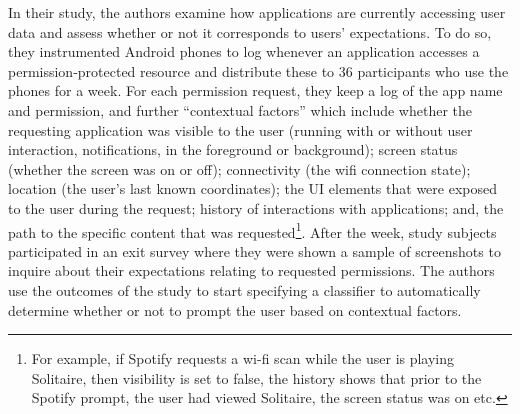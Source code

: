 \documentclass[../thesis.tex]{subfiles}
\begin{document}
In their study, the authors examine how applications are currently
accessing user data and assess whether or not it corresponds to
users' expectations. To do so, they instrumented
Android phones to log whenever an application accesses a
permission-protected resource and distribute these to 36 participants
who use the phones for a week. For each permission request, they keep a
log of the app name and permission, and further
``contextual factors'' which include
whether the requesting application was visible to the user (running
with or without user interaction, notifications, in the foreground or
background); screen status (whether the screen was on or off);
connectivity (the wifi connection state); location (the
user's last known coordinates); the UI elements that
were exposed to the user during the request; history of interactions
with applications; and, the path to the specific content that was
requested\footnote{ For example, if Spotify requests a wi-fi scan while
the user is playing Solitaire, then visibility is set to false, the
history shows that prior to the Spotify prompt, the user had viewed
Solitaire, the screen status was on etc.}. After the week, study
subjects participated in an exit survey where they were shown a sample
of screenshots to inquire about their expectations relating to
requested permissions. The authors use the outcomes of the study to
start specifying a classifier to automatically determine whether or not
to prompt the user based on contextual factors.
\end{document}
